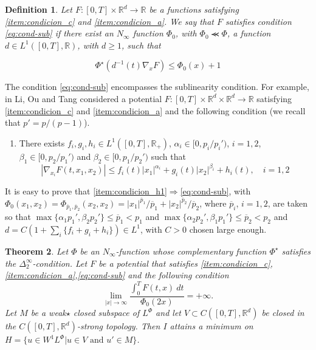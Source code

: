 \documentclass[twoside]{article}
\makeatletter
\newtheorem{thm}{Theorem}[section]
\newtheorem{defi}[thm]{Definition}
\theoremstyle{remark}
\newcounter{example}[section]
\newcommand{\labitem}[2]{%
\def\@itemlabel{#1}
\item
\def\@currentlabel{#1}\label{#2}}
\newcommand{\lphi}{L^{\Phi}}
\newcommand{\wphi}{W^{1}\lphi}
\newcommand{\rr}{\mathbb{R}}
\renewcommand{\leq}{\leqslant}
\renewcommand{\geq}{\geqslant}
\makeatother
\begin{document}
\begin{defi} Let $F:[0,T]\times \rr^d\to\rr$ be a functions satisfying \ref{item:condicion_c} and \ref{item:condicion_a}. We say that $F$ satisfies condition \eqref{eq:cond-sub} if there exist an $N_{\infty}$ function $\Phi_0$, with $\Phi_0 \llcurly \Phi$,
a function $d \in  L^1([0,T],\rr)$, with $d\geq 1$, such that

\begin{equation}\label{eq:cond-sub}
  \Phi^{\star}(d^{-1}(t)\nabla_x F)\leq \Phi_0(x)+1\tag{$B$}
\end{equation}
\end{defi}


The condition \eqref{eq:cond-sub} encompasses the sublinearity condition. For example, in
 \cite[Th. 1.1.]{li2014periodic} Li, Ou and Tang considered a potential $F:[0,T]\times\rr^d\times\rr^d\to\rr$ satisfying \ref{item:condicion_c} and \ref {item:condicion_a} and the following condition  (we recall that $p'=p/(p-1)$). 
\begin{enumerate}   
  \labitem{(H)}{item:condicion_h1} There exists $f_i,g_i,h_i\in L^1([0,T],\rr_+)$,  $\alpha_i\in [0,p_i/p_i')$, $i=1,2$,  $\beta_1\in [0,p_2/p_1')$ and $\beta_2\in [0,p_1/p_2')$ such that
 \begin{equation*}
    |\nabla_{x_i}F(t,x_1,x_2)|\leq f_i(t)|x_1|^{\alpha_i}+g_i(t)|x_2|^{\beta_i}+h_i(t),\quad i=1,2
 \end{equation*}
\end{enumerate}
It is easy to prove that \ref{item:condicion_h1}$\Rightarrow$\eqref{eq:cond-sub}, with 
$\Phi_0(x_1,x_2)=\Phi_{\overline{p}_1,\overline{p}_2}(x_2,x_2)=|x_1|^{\overline{p}_1}/\overline{p}_1+|x_2|^{\overline{p}_2}/\overline{p}_2$, where $\overline{p}_i$, $i=1,2$, are taken so that  $\max\{\alpha_1p_1',\beta_2p_2'\}\leq \overline{p}_1<p_1$ and $\max\{\alpha_2p_2',\beta_1p_1'\}\leq \overline{p}_2<p_2$ and  $d=C(1+\sum_i \{f_i+g_i+h_i\})\in L^1$, with  $C>0$ chosen large enough.









\begin{thm}\label{coercitividad-r}
  Let $\Phi$ be an $N_{\infty}$-function whose complementary function $\Phi^{\star}$ satisfies the $\Delta_2^{\infty}$-condition. Let $F$ be a potential that satisfies \ref{item:condicion_c}, \ref{item:condicion_a},\eqref{eq:cond-sub} and the following condition
\begin{equation}\label{eq:propiedad-coercividad-phi0}
\lim_{|x|\to\infty}\frac{\int_{0}^{T}F(t,x)\ dt}{\Phi_0(2x)}=+\infty.
\end{equation}
Let $M$ be a weak${\star}$ closed subspace of $\lphi$ and let $V\subset C([0,T],\rr^d)$ be closed in the $C([0,T],\rr^d)$-strong topology. Then  $I$ attains a minimum on $H=\{u\in \wphi | u\in V\text{ and } u'\in M\}$.
\end{thm}
\end{document}
